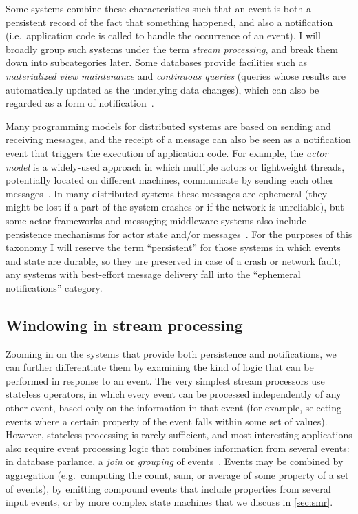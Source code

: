 \documentclass[sigconf]{acmart}
\begin{document}
Some systems combine these characteristics such that an event is both a persistent record of the fact that something happened, and also a notification (i.e.\ application code is called to handle the occurrence of an event).
I will broadly group such systems under the term \emph{stream processing}, and break them down into subcategories later.
Some databases provide facilities such as \emph{materialized view maintenance} and \emph{continuous queries} (queries whose results are automatically updated as the underlying data changes), which can also be regarded as a form of notification~\cite{Chirkova:2012,Gupta:1999}.

Many programming models for distributed systems are based on sending and receiving messages, and the receipt of a message can also be seen as a notification event that triggers the execution of application code.
For example, the \emph{actor model} is a widely-used approach in which multiple actors or lightweight threads, potentially located on different machines, communicate by sending each other messages~\cite{Valkov:2018}.
In many distributed systems these messages are ephemeral (they might be lost if a part of the system crashes or if the network is unreliable), but some actor frameworks and messaging middleware systems also include persistence mechanisms for actor state and/or messages~\cite{Bernstein:2014}.
For the purposes of this taxonomy I will reserve the term ``persistent'' for those systems in which events and state are durable, so they are preserved in case of a crash or network fault; any systems with best-effort message delivery fall into the ``ephemeral notifications'' category.

\subsection{Windowing in stream processing}\label{sec:windowing}

Zooming in on the systems that provide both persistence and notifications, we can further differentiate them by examining the kind of logic that can be performed in response to an event.
The very simplest stream processors use stateless operators, in which every event can be processed independently of any other event, based only on the information in that event (for example, selecting events where a certain property of the event falls within some set of values).
However, stateless processing is rarely sufficient, and most interesting applications also require event processing logic that combines information from several events: in database parlance, a \emph{join} or \emph{grouping} of events~\cite{Carbone:2015}.
Events may be combined by aggregation (e.g.\ computing the count, sum, or average of some property of a set of events), by emitting compound events that include properties from several input events, or by more complex state machines that we discuss in \autoref{sec:smr}.
\end{document}
